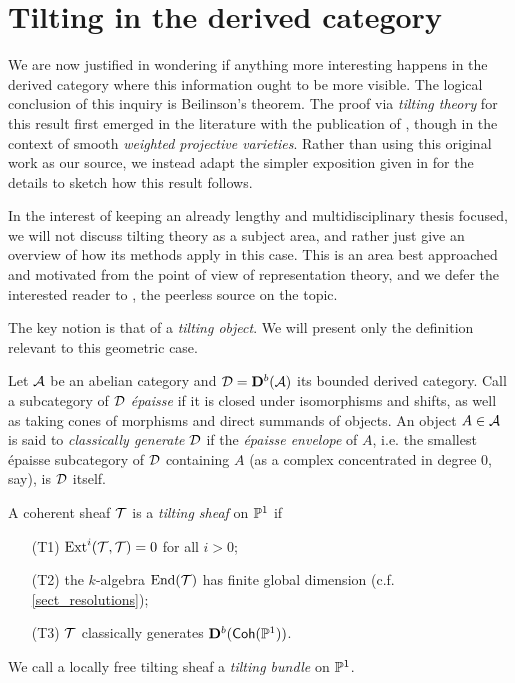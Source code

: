 \section{Tilting in the derived category}

We are now justified in wondering if anything more interesting
happens in the derived category where this information ought to be more visible.
The logical conclusion of this inquiry is Beilinson's theorem.
The proof via \emph{tilting theory} for this result first emerged in
the literature with the publication of \cite{baer}, though in the
context of smooth \emph{weighted projective varieties}.
Rather than using this original work as our source, we instead adapt
the simpler exposition given in \cite{craw} for the details to sketch
how this result follows.

In the interest of keeping an already lengthy and multidisciplinary
thesis focused, we will not discuss tilting theory as a subject area,
and rather just give an overview of how its methods apply in this case.
This is an area best approached and motivated from the point of view
of representation theory, and we defer the interested reader to
\cite{handbook_of_tilting_theory}, the peerless source on the topic.

The key notion is that of a \emph{tilting object}.
We will present only the definition relevant to this geometric case.

\begin{definition}
  Let $\abcat{A}$ be an abelian category and $\triangcat{D} =
  \dercat[b]{\abcat{A}}$ its bounded derived category.
  Call a subcategory of $\triangcat{D}$ \emph{\'{e}paisse} if it is
  closed under isomorphisms and shifts, as well as taking cones of
  morphisms and direct summands of objects.
  An object $A \in \abcat{A}$ is said to \emph{classically generate}
  $\triangcat{D}$ if the \emph{\'{e}paisse envelope} of $A$, i.e. the
  smallest \'{e}paisse subcategory of $\triangcat{D}$ containing $A$
  (as a complex concentrated in degree 0, say), is $\triangcat{D}$ itself.
\end{definition}

\begin{definition}
  A coherent sheaf $\shf{T}$ is a \emph{tilting sheaf} on $\proj{1}$ if
  \begin{enumerate}[leftmargin=3.9em]
    \item[(T1)] $\Extalt{i}(\shf{T}, \shf{T}) = 0$ for all $i > 0$;
    \item[(T2)] the $k$-algebra $\End(\shf{T})$ has finite global
      dimension (c.f. \cref{sect_resolutions});
    \item[(T3)] $\shf{T}$ classically generates $\dercat[b]{\Coh(\proj{1})}$.
  \end{enumerate}
  We call a locally free tilting sheaf a \emph{tilting bundle} on $\proj{1}$.
\end{definition}

